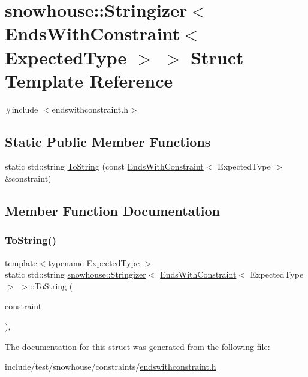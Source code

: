 \hypertarget{structsnowhouse_1_1Stringizer_3_01EndsWithConstraint_3_01ExpectedType_01_4_01_4}{}\section{snowhouse\+::Stringizer$<$ Ends\+With\+Constraint$<$ Expected\+Type $>$ $>$ Struct Template Reference}
\label{structsnowhouse_1_1Stringizer_3_01EndsWithConstraint_3_01ExpectedType_01_4_01_4}


{\ttfamily \#include $<$endswithconstraint.\+h$>$}

\subsection*{Static Public Member Functions}
\begin{DoxyCompactItemize}
\item 
static std\+::string \mbox{\hyperlink{structsnowhouse_1_1Stringizer_3_01EndsWithConstraint_3_01ExpectedType_01_4_01_4_a99dc8f441e2fd81f8371992d8709685d}{To\+String}} (const \mbox{\hyperlink{structsnowhouse_1_1EndsWithConstraint}{Ends\+With\+Constraint}}$<$ Expected\+Type $>$ \&constraint)
\end{DoxyCompactItemize}


\subsection{Member Function Documentation}
\mbox{\label{structsnowhouse_1_1Stringizer_3_01EndsWithConstraint_3_01ExpectedType_01_4_01_4_a99dc8f441e2fd81f8371992d8709685d}} 
\subsubsection{\texorpdfstring{ToString()}{ToString()}}
{\footnotesize\ttfamily template$<$typename Expected\+Type $>$ \\
static std\+::string \mbox{\hyperlink{structsnowhouse_1_1Stringizer}{snowhouse\+::\+Stringizer}}$<$ \mbox{\hyperlink{structsnowhouse_1_1EndsWithConstraint}{Ends\+With\+Constraint}}$<$ Expected\+Type $>$ $>$\+::To\+String (\begin{DoxyParamCaption}\item[{const \mbox{\hyperlink{structsnowhouse_1_1EndsWithConstraint}{Ends\+With\+Constraint}}$<$ Expected\+Type $>$ \&}]{constraint }\end{DoxyParamCaption})\hspace{0.3cm}{\ttfamily [inline]}, {\ttfamily [static]}}



The documentation for this struct was generated from the following file\+:\begin{DoxyCompactItemize}
\item 
include/test/snowhouse/constraints/\mbox{\hyperlink{endswithconstraint_8h}{endswithconstraint.\+h}}\end{DoxyCompactItemize}

